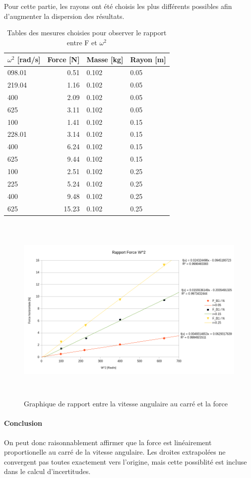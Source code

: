 Pour cette partie, les rayons ont été choisis les plus différents possibles afin d'augmenter la dispersion des résultats.

\begin{table}[ht]
    \caption[Tables mesures vitesse angulaire force]{Tables des mesures choisies pour observer le rapport entre F et $\omega^2$}
    \centering
    \begin{tabular}{|l|r|l|l|}
	\hline
	$\omega^2$ [rad/s] & Force [N] & Masse [kg] & Rayon [m]\\
	\hline
	098.01	&0.51	&0.102	&0.05\\
	219.04	&1.16	&0.102	&0.05\\
	400	&2.09	&0.102	&0.05\\
	625	&3.11	&0.102	&0.05\\
	100	&1.41	&0.102	&0.15\\
	228.01	&3.14	&0.102	&0.15\\
	400	&6.24	&0.102	&0.15\\
	625	&9.44	&0.102	&0.15\\
	100	&2.51	&0.102	&0.25\\
	225	&5.24	&0.102	&0.25\\
	400	&9.48	&0.102	&0.25\\
	625	&15.23	&0.102	&0.25\\
	\hline
    \end{tabular}
\end{table}

\begin{figure}[!h]
    \caption[Graphique $\omega^2$ - force]{Graphique de rapport entre la vitesse angulaire au carré et la force}
    \centering
    \includegraphics[height=25em]{Save03.png}
\end{figure}


\paragraph{Conclusion}

On peut donc raisonnablement affirmer que la force est linéairement proportionelle au carré de la vitesse angulaire.
Les droites extrapolées ne convergent pas toutes exactement vers l'origine, mais cette possiblité est incluse dans le calcul d'incertitudes.

